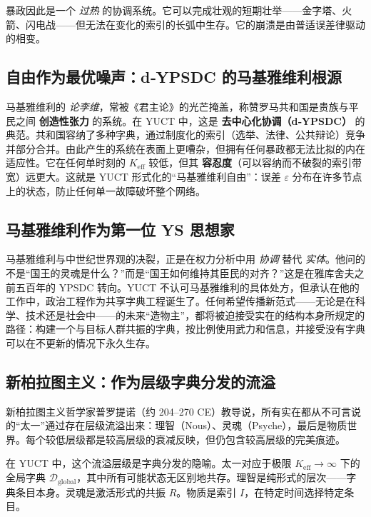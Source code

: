 \documentclass[12pt,a4paper]{article}
\newcommand{\Keff}{K_{\mathrm{eff}}}
\begin{document}
	暴政因此是一个 \emph{过热} 的协调系统。它可以完成壮观的短期壮举——金字塔、火箭、闪电战——但无法在变化的索引的长弧中生存。它的崩溃是由普适误差律驱动的相变。
	
	\subsection{自由作为最优噪声：d‑YPSDC 的马基雅维利根源}
	
	马基雅维利的 \emph{论李维}，常被《君主论》的光芒掩盖，称赞罗马共和国是贵族与平民之间 \textbf{创造性张力} 的系统。在 YUCT 中，这是 \textbf{去中心化协调（d‑YPSDC）} 的典范。共和国容纳了多种字典，通过制度化的索引（选举、法律、公共辩论）竞争并部分合并。由此产生的系统在表面上更嘈杂，但拥有任何暴政都无法比拟的内在适应性。它在任何单时刻的 \(\Keff\) 较低，但其 \textbf{容忍度}（可以容纳而不破裂的索引带宽）远更大。这就是 YUCT 形式化的“马基雅维利自由”：误差 \(\varepsilon\) 分布在许多节点上的状态，防止任何单一故障破坏整个网络。
	
	\subsection{马基雅维利作为第一位 YS 思想家}
	
	马基雅维利与中世纪世界观的决裂，正是在权力分析中用 \emph{协调} 替代 \emph{实体}。他问的不是“国王的灵魂是什么？”而是“国王如何维持其臣民的对齐？”这是在雅库舍夫之前五百年的 YPSDC 转向。YUCT 不认可马基雅维利的具体处方，但承认在他的工作中，政治工程作为共享字典工程诞生了。任何希望传播新范式——无论是在科学、技术还是社会中——的未来“造物主”，都将被迫接受实在的结构本身所规定的路径：构建一个与目标人群共振的字典，按比例使用武力和信息，并接受没有字典可以在不更新的情况下永久生存。
	
	\subsection{新柏拉图主义：作为层级字典分发的流溢}
	
	新柏拉图主义哲学家普罗提诺（约 204–270 CE）教导说，所有实在都从不可言说的“太一”通过存在层级流溢出来：理智（Nous）、灵魂（Psyche），最后是物质世界。每个较低层级都是较高层级的衰减反映，但仍包含较高层级的完美痕迹。
	
	在 YUCT 中，这个流溢层级是字典分发的隐喻。太一对应于极限 \(K_{\mathrm{eff}} \to \infty\) 下的全局字典 \(\mathcal{D}_{\text{global}}\)，其中所有可能状态无区别地共存。理智是纯形式的层次——字典条目本身。灵魂是激活形式的共振 \(R\)。物质是索引 \(I\)，在特定时间选择特定条目。
	
\end{document}
